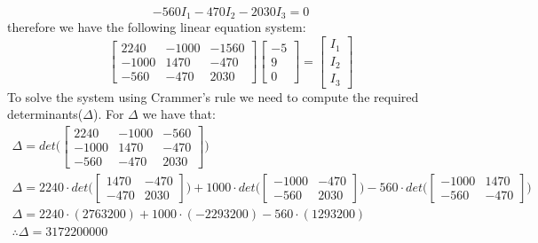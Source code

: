 \documentclass[letterpaper]{article}
\begin{document}
\begin{equation}-560I_1-470I_2-2030I_3 = 0\label{eq:3}\end{equation}
    therefore we have the following linear equation system:
    \[
        \begin{bmatrix}
            2240 & -1000 & -1560\\
            -1000 & 1470 & -470\\
            -560 & -470 & 2030
        \end{bmatrix}
    \begin{bmatrix}
        -5\\
        9\\
        0
    \end{bmatrix}
    =
    \begin{bmatrix}
        I_1\\
        I_2\\
        I_3
    \end{bmatrix}
\]
To solve the system using Crammer's rule we need to compute the required determinants($\Delta$). For
$\Delta$ we have that:
    \begin{gather*}
        \Delta = det\Bigg(
        \begin{bmatrix}
            2240 & -1000 & -560\\
            -1000 & 1470 & -470\\
            -560 & -470 & 2030
        \end{bmatrix}
        \Bigg)\\
        \Delta = 2240\cdot det\bigg(
        \begin{bmatrix}
            1470 & -470\\
            -470 & 2030
        \end{bmatrix}
        \bigg)
        +1000\cdot det\bigg(
        \begin{bmatrix}
            -1000 & -470\\
            -560 & 2030
        \end{bmatrix}
        \bigg)
        -560\cdot det\bigg(
        \begin{bmatrix}
            -1000 & 1470\\
            -560 & -470
        \end{bmatrix}
        \bigg)\\
        \Delta = 2240\cdot(2763200)+1000\cdot(-2293200)-560\cdot(1293200)\\
        \therefore\Delta = 3172200000
    \end{gather*}
\end{document}
